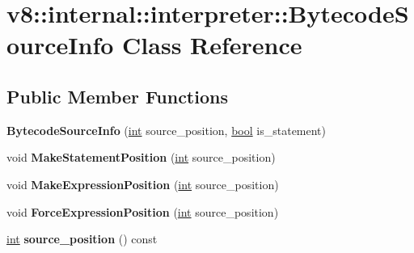 \hypertarget{classv8_1_1internal_1_1interpreter_1_1BytecodeSourceInfo}{}\section{v8\+:\+:internal\+:\+:interpreter\+:\+:Bytecode\+Source\+Info Class Reference}
\label{classv8_1_1internal_1_1interpreter_1_1BytecodeSourceInfo}
\subsection*{Public Member Functions}
\begin{DoxyCompactItemize}
\item 
\mbox{\label{classv8_1_1internal_1_1interpreter_1_1BytecodeSourceInfo_a3f0323eea6989d82039e2b88ff4b82ed}} 
{\bfseries Bytecode\+Source\+Info} (\mbox{\hyperlink{classint}{int}} source\+\_\+position, \mbox{\hyperlink{classbool}{bool}} is\+\_\+statement)
\item 
\mbox{\label{classv8_1_1internal_1_1interpreter_1_1BytecodeSourceInfo_ade14f31e2489bc03a32e1919a445d89e}} 
void {\bfseries Make\+Statement\+Position} (\mbox{\hyperlink{classint}{int}} source\+\_\+position)
\item 
\mbox{\label{classv8_1_1internal_1_1interpreter_1_1BytecodeSourceInfo_a7b630bdfc2599ad86e1a98abe06af5c9}} 
void {\bfseries Make\+Expression\+Position} (\mbox{\hyperlink{classint}{int}} source\+\_\+position)
\item 
\mbox{\label{classv8_1_1internal_1_1interpreter_1_1BytecodeSourceInfo_a1c8bb926771052b4aba70e572d02b816}} 
void {\bfseries Force\+Expression\+Position} (\mbox{\hyperlink{classint}{int}} source\+\_\+position)
\item 
\mbox{\label{classv8_1_1internal_1_1interpreter_1_1BytecodeSourceInfo_a73c64b75ff24baaef3217c1243ef781f}} 
\mbox{\hyperlink{classint}{int}} {\bfseries source\+\_\+position} () const
\item 

\end{DoxyCompactItemize}
